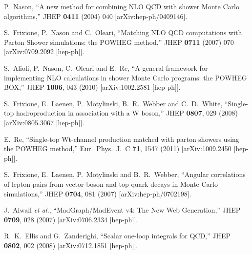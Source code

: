 \documentclass[paper]{JHEP3}
\begin{document}
\begin{thebibliography}{10}

  P.~Nason,
  ``A new method for combining NLO QCD with shower Monte Carlo algorithms,''
  JHEP {\bf 0411} (2004) 040
  [arXiv:hep-ph/0409146].

  S.~Frixione, P.~Nason and C.~Oleari,
``Matching NLO QCD computations with Parton Shower simulations: the POWHEG
method,''
  JHEP {\bf 0711} (2007) 070
  [arXiv:0709.2092 [hep-ph]].

  S.~Alioli, P.~Nason, C.~Oleari and E.~Re,
``A general framework for implementing NLO calculations in shower Monte Carlo
programs: the POWHEG BOX,''
  JHEP {\bf 1006}, 043 (2010)
  [arXiv:1002.2581 [hep-ph]].

  S.~Frixione, E.~Laenen, P.~Motylinski, B.~R.~Webber and C.~D.~White,
  ``Single-top hadroproduction in association with a W boson,''
  JHEP {\bf 0807}, 029 (2008)
  [arXiv:0805.3067 [hep-ph]].

  E.~Re,
  ``Single-top Wt-channel production matched with parton showers using the
  POWHEG method,''
  Eur.\ Phys.\ J.\  C {\bf 71}, 1547 (2011)
  [arXiv:1009.2450 [hep-ph]].


  S.~Frixione, E.~Laenen, P.~Motylinski and B.~R.~Webber,
  ``Angular correlations of lepton pairs from vector boson and top quark decays
  in Monte Carlo simulations,''
  JHEP {\bf 0704}, 081 (2007)
  [arXiv:hep-ph/0702198].

  J.~Alwall {\it et al.},
  ``MadGraph/MadEvent v4: The New Web Generation,''
  JHEP {\bf 0709}, 028 (2007)
  [arXiv:0706.2334 [hep-ph]].

  R.~K.~Ellis and G.~Zanderighi,
  ``Scalar one-loop integrals for QCD,''
  JHEP {\bf 0802}, 002 (2008)
  [arXiv:0712.1851 [hep-ph]].


\end{thebibliography}
\end{document}
